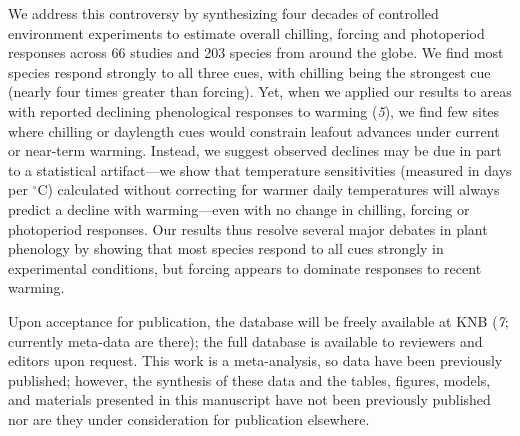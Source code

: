 \documentclass[10.5pt,a4paper]{letter}
\begin{document}
\begin{letter}{}
\par We address this controversy by synthesizing four decades of controlled environment experiments to estimate overall chilling, forcing and photoperiod responses across 66 studies and 203 species from around the globe. We find most species respond strongly to all three cues, with chilling being the strongest cue (nearly four times greater than forcing). Yet, when we applied our results to areas with reported declining phenological responses to warming (\emph{5}), we find few sites where chilling or daylength cues would constrain leafout advances under current or near-term warming. Instead, we suggest observed declines may be due in part to a statistical artifact---we show that temperature sensitivities (measured in days per $^{\circ}$C) calculated without correcting for warmer daily temperatures will always predict a decline with warming---even with no change in chilling, forcing or photoperiod responses. %
Our results thus resolve several major debates in plant phenology by showing that most species respond to all cues strongly in experimental conditions, but forcing appears to dominate responses to recent warming. %

\par Upon acceptance for publication, the database will be freely available at KNB (\emph{7}; currently meta-data are there); the full database is available to reviewers and editors upon request. This work is a meta-analysis, so data have been previously published; however, the synthesis of these data and the tables, figures, models, and materials presented in this manuscript have not been previously published nor are they under consideration for publication elsewhere.


\end{letter}
\end{document}
